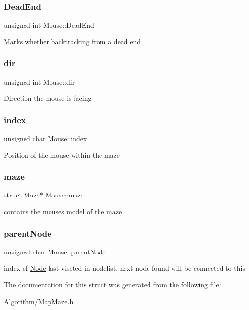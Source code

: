 \subsubsection{\texorpdfstring{Dead\+End}{DeadEnd}}
{\footnotesize\ttfamily unsigned int Mouse\+::\+Dead\+End}

Marks whether backtracking from a dead end \mbox{\label{structMouse_a6d4adc5b89ee69f33487e894e94b2640}} 
\subsubsection{\texorpdfstring{dir}{dir}}
{\footnotesize\ttfamily unsigned int Mouse\+::dir}

Direction the mouse is facing \mbox{\label{structMouse_acdc68538ce06d1a8c134b359baf1ca54}} 
\subsubsection{\texorpdfstring{index}{index}}
{\footnotesize\ttfamily unsigned char Mouse\+::index}

Position of the mouse within the maze \mbox{\label{structMouse_ab8306542bdc35dfbbf53e734a364124e}} 
\subsubsection{\texorpdfstring{maze}{maze}}
{\footnotesize\ttfamily struct \hyperlink{structMaze}{Maze}$\ast$ Mouse\+::maze}

contains the mouse\textquotesingle{}s model of the maze \mbox{\label{structMouse_ae6ac50ea4f691724ca55079ea4ddbd4b}} 
\subsubsection{\texorpdfstring{parent\+Node}{parentNode}}
{\footnotesize\ttfamily unsigned char Mouse\+::parent\+Node}

index of \hyperlink{structNode}{Node} last viseted in nodelist, next node found will be connected to this 

The documentation for this struct was generated from the following file\+:\begin{DoxyCompactItemize}
\item 
Algorithm/Map\+Maze.\+h\end{DoxyCompactItemize}

